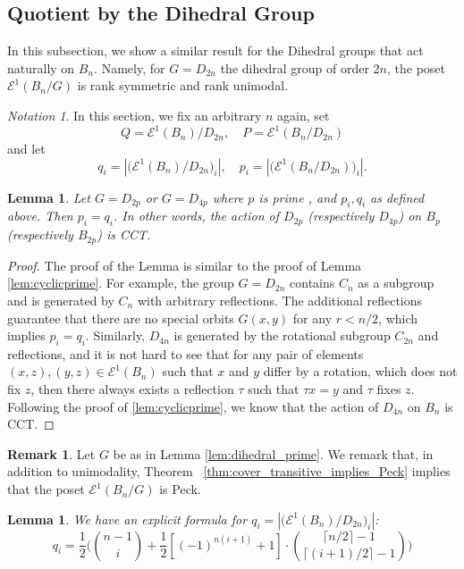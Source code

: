 \documentclass[10 pt]{amsart}
\theoremstyle{plain}
\newtheorem{lem}[thm]{Lemma}
\theoremstyle{definition}
\newtheorem{rem}[thm]{Remark}
\theoremstyle{remark}
\newtheorem{note}[thm]{Notation}
\numberwithin{equation}{section}
\newcommand\ssec{\subsection}
\begin{document}
\ssec{Quotient by the Dihedral Group}
\label{ssec:dihedral}

In this subsection, we show a similar result for the Dihedral groups that act naturally on $B_n$. Namely, for $G = D_{2n}$ the dihedral group of order $2n$, the poset $\mathcal E^1(B_n/G)$ is rank symmetric and rank unimodal.


\begin{note} In this section, we fix an arbitrary $n$ again, set $$Q = \mathcal E^1 (B_n)/D_{2n}, \quad P = \mathcal E^1(B_n/D_{2n})$$ and let $$q_i = |\big( \mathcal E^1 (B_n)/D_{2n} \big)_i|, \quad p_i = |\big( \mathcal E^1(B_n/D_{2n}) \big)_i|. $$ 
\end{note}


\begin{lem}{\label{lem:dihedral_prime}}
Let $G = D_{2p}$ or $G = D_{4p}$ where $p$ is prime , and $p_i, q_i$ as defined above. Then $p_i = q_i$. In other words, the action of $D_{2p}$ (respectively $D_{4p}$) on $B_p$ (respectively $B_{2p} $) is CCT. 
\end{lem}

\begin{proof}
The proof of the Lemma is similar to the proof of Lemma \ref{lem:cyclicprime}. For example, the group $G = D_{2n}$ contains $C_n$ as a subgroup and is generated by $C_n$ with arbitrary reflections. The additional reflections guarantee that there are no special orbits $G(x , y)$ for any $r < n/2$, which implies $p_i = q_i$. Similarly, $D_{4n}$ is generated by the rotational subgroup $C_{2n}$ and reflections, and it is not hard to see that for any pair of elements $(x, z), (y, z) \in \mathcal E^1(B_n)$ such that $x$ and $y$ differ by a rotation, which does not fix $z$, then there always exists a reflection $\tau$ such that $\tau x = y$ and $\tau$ fixes $z$. 
 Following the proof of \ref{lem:cyclicprime}, we know that the action of $D_{4n}$ on $B_n$ is CCT.
\end{proof}

\begin{rem}
Let $G$ be as in Lemma \ref{lem:dihedral_prime}. We remark that, in addition to unimodality, Theorem ~\ref{thm:cover_transitive_implies_Peck} implies that the poset $\mathcal E^1(B_n/G)$ is Peck.
\end{rem}


\begin{lem}{\label{dihedral002}}
 We have an explicit formula for $q_i = |\big(\mathcal E^1 (B_n)/D_{2n} \big)_i|$:
 $$q_i = \frac{1}{2} \Big( {n-1 \choose i } + \frac{1}{2} [(-1)^{n(i+1)}+1] \cdot { \lceil n/2\rceil -1  \choose \lceil (i+1)/2 \rceil - 1}  \Big)$$
\end{lem}
\end{document}
